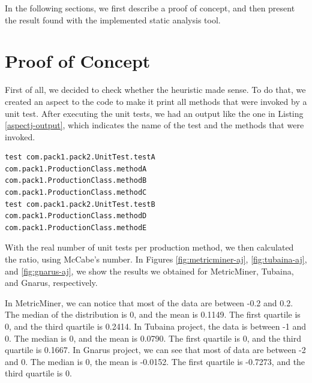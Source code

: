 \documentclass{sig-alternate}
\begin{document}
In the following sections, we first describe a proof of concept, and then present the result found
with the implemented static analysis tool.


\section{Proof of Concept}
\label{poc}

First of all, we decided to check whether the heuristic made sense. To do that, we 
created an aspect to the code to make it print all methods that were invoked by a unit test. 
After executing the unit tests, we had an output
like the one in Listing \ref{aspectj-output}, 
which indicates the name of the test and the methods that were invoked.

\begin{lstlisting}
test com.pack1.pack2.UnitTest.testA
com.pack1.ProductionClass.methodA
com.pack1.ProductionClass.methodB
com.pack1.ProductionClass.methodC
test com.pack1.pack2.UnitTest.testB
com.pack1.ProductionClass.methodD
com.pack1.ProductionClass.methodE
\end{lstlisting}

With the real number of unit tests per production method, we then
calculated the ratio, using McCabe's number. In Figures \ref{fig:metricminer-aj}, \ref{fig:tubaina-aj}, and
\ref{fig:gnarus-aj}, we show the results we obtained for MetricMiner, Tubaina, and Gnarus, respectively. 

In MetricMiner, we can notice that most of the data are between -0.2 and 0.2. 
The median of the distribution is 0, and the mean is 0.1149. The first quartile is 0, and the
third quartile is 0.2414.
In Tubaina project, the data is between
-1 and 0. The median is 0, and the mean is 0.0790. The first quartile is
0, and the third quartile is 0.1667. 
In Gnarus project, we can see that most of data
are between -2 and 0. The median is 0, the mean is -0.0152. The first quartile
is -0.7273, and the third quartile is 0.
\end{document}
